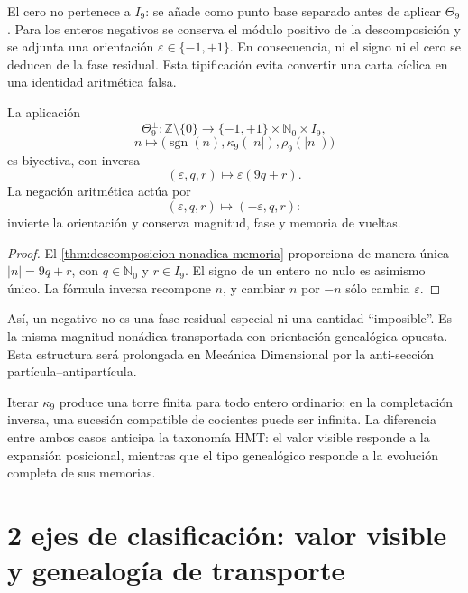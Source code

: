 El cero no pertenece a \(I_9\): se añade como punto base separado antes de
aplicar \(\Theta_9\). Para los enteros negativos se conserva el módulo
positivo de la descomposición y se adjunta una orientación
\(\varepsilon\in\{-1,+1\}\). En consecuencia, ni el signo ni el cero se
deducen de la fase residual. Esta tipificación evita convertir una carta
cíclica en una identidad aritmética falsa.

\begin{theorem}
\label{thm:entero-orientado-signo-genealogico}
La aplicación
\[
\Theta_9^\pm:
\mathbb Z\setminus\{0\}
\longrightarrow
\{-1,+1\}\times\mathbb N_0\times I_9,
\]
\[
n\longmapsto
\bigl(\operatorname{sgn}(n),
      \kappa_9(|n|),
      \rho_9(|n|)\bigr)
\]
es biyectiva, con inversa
\[
(\varepsilon,q,r)\longmapsto\varepsilon(9q+r).
\]
La negación aritmética actúa por
\[
(\varepsilon,q,r)\longmapsto(-\varepsilon,q,r):
\]
invierte la orientación y conserva magnitud, fase y memoria de vueltas.
\end{theorem}

\begin{proof}
El \cref{thm:descomposicion-nonadica-memoria} proporciona de manera única
\(|n|=9q+r\), con \(q\in\mathbb N_0\) y \(r\in I_9\). El signo de un entero
no nulo es asimismo único. La fórmula inversa recompone \(n\), y cambiar
\(n\) por \(-n\) sólo cambia \(\varepsilon\).
\end{proof}

Así, un negativo no es una fase residual especial ni una cantidad
``imposible''. Es la misma magnitud nonádica transportada con orientación
genealógica opuesta. Esta estructura será prolongada en Mecánica Dimensional
por la anti-sección partícula--antipartícula.

Iterar \(\kappa_9\) produce una torre finita para todo entero ordinario; en
la completación inversa, una sucesión compatible de cocientes puede ser
infinita. La diferencia entre ambos casos anticipa la taxonomía HMT: el valor
visible responde a la expansión posicional, mientras que el tipo genealógico
responde a la evolución completa de sus memorias.

\section{2 ejes de clasificación: valor visible y genealogía de transporte}

